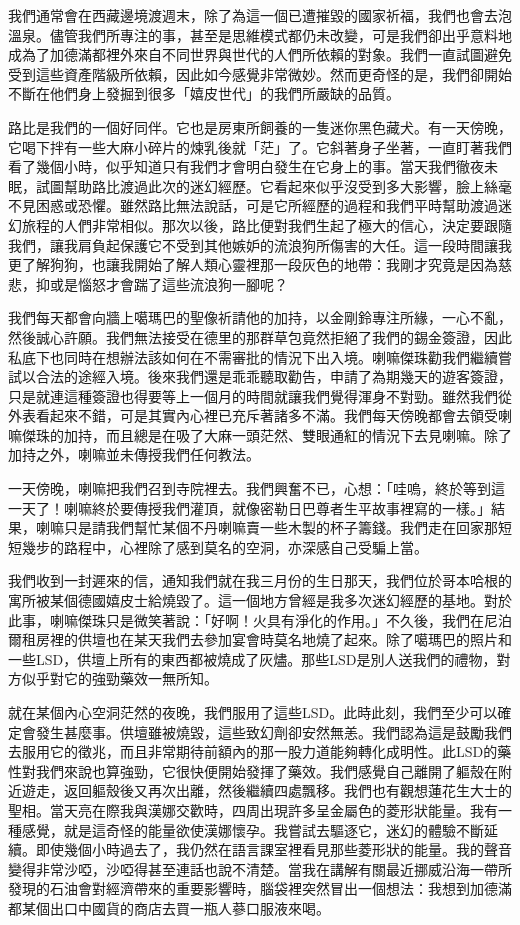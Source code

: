 我們通常會在西藏邊境渡週末，除了為這一個已遭摧毀的國家祈福，我們也會去泡溫泉。儘管我們所專注的事，甚至是思維模式都仍未改變，可是我們卻出乎意料地成為了加德滿都裡外來自不同世界與世代的人們所依賴的對象。我們一直試圖避免受到這些資產階級所依賴，因此如今感覺非常微妙。然而更奇怪的是，我們卻開始不斷在他們身上發掘到很多「嬉皮世代」的我們所嚴缺的品質。

路比是我們的一個好同伴。它也是房東所飼養的一隻迷你黑色藏犬。有一天傍晚，它喝下拌有一些大麻小碎片的煉乳後就「茫」了。它斜著身子坐著，一直盯著我們看了幾個小時，似乎知道只有我們才會明白發生在它身上的事。當天我們徹夜未眠，試圖幫助路比渡過此次的迷幻經歷。它看起來似乎沒受到多大影響，臉上絲毫不見困惑或恐懼。雖然路比無法說話，可是它所經歷的過程和我們平時幫助渡過迷幻旅程的人們非常相似。那次以後，路比便對我們生起了極大的信心，決定要跟隨我們，讓我肩負起保護它不受到其他嫉妒的流浪狗所傷害的大任。這一段時間讓我更了解狗狗，也讓我開始了解人類心靈裡那一段灰色的地帶：我剛才究竟是因為慈悲，抑或是惱怒才會踹了這些流浪狗一腳呢？

我們每天都會向牆上噶瑪巴的聖像祈請他的加持，以金剛鈴專注所緣，一心不亂，然後誠心許願。我們無法接受在德里的那群草包竟然拒絕了我們的錫金簽證，因此私底下也同時在想辦法該如何在不需審批的情況下出入境。喇嘛傑珠勸我們繼續嘗試以合法的途經入境。後來我們還是乖乖聽取勸告，申請了為期幾天的遊客簽證，只是就連這種簽證也得要等上一個月的時間就讓我們覺得渾身不對勁。雖然我們從外表看起來不錯，可是其實內心裡已充斥著諸多不滿。我們每天傍晚都會去領受喇嘛傑珠的加持，而且總是在吸了大麻一頭茫然、雙眼通紅的情況下去見喇嘛。除了加持之外，喇嘛並未傳授我們任何教法。

一天傍晚，喇嘛把我們召到寺院裡去。我們興奮不已，心想：「哇嗚，終於等到這一天了！喇嘛終於要傳授我們灌頂，就像密勒日巴尊者生平故事裡寫的一樣。」結果，喇嘛只是請我們幫忙某個不丹喇嘛賣一些木製的杯子籌錢。我們走在回家那短短幾步的路程中，心裡除了感到莫名的空洞，亦深感自己受騙上當。

我們收到一封遲來的信，通知我們就在我三月份的生日那天，我們位於哥本哈根的寓所被某個德國嬉皮士給燒毀了。這一個地方曾經是我多次迷幻經歷的基地。對於此事，喇嘛傑珠只是微笑著說：「好啊！火具有淨化的作用。」不久後，我們在尼泊爾租房裡的供壇也在某天我們去參加宴會時莫名地燒了起來。除了噶瑪巴的照片和一些LSD，供壇上所有的東西都被燒成了灰燼。那些LSD是別人送我們的禮物，對方似乎對它的強勁藥效一無所知。

就在某個內心空洞茫然的夜晚，我們服用了這些LSD。此時此刻，我們至少可以確定會發生甚麼事。供壇雖被燒毀，這些致幻劑卻安然無恙。我們認為這是鼓勵我們去服用它的徵兆，而且非常期待前額內的那一股力道能夠轉化成明性。此LSD的藥性對我們來說也算強勁，它很快便開始發揮了藥效。我們感覺自己離開了軀殼在附近遊走，返回軀殼後又再次出離，然後繼續四處飄移。我們也有觀想蓮花生大士的聖相。當天亮在際我與漢娜交歡時，四周出現許多呈金屬色的菱形狀能量。我有一種感覺，就是這奇怪的能量欲使漢娜懷孕。我嘗試去驅逐它，迷幻的體驗不斷延續。即使幾個小時過去了，我仍然在語言課室裡看見那些菱形狀的能量。我的聲音變得非常沙啞，沙啞得甚至連話也說不清楚。當我在講解有關最近挪威沿海一帶所發現的石油會對經濟帶來的重要影響時，腦袋裡突然冒出一個想法：我想到加德滿都某個出口中國貨的商店去買一瓶人蔘口服液來喝。

